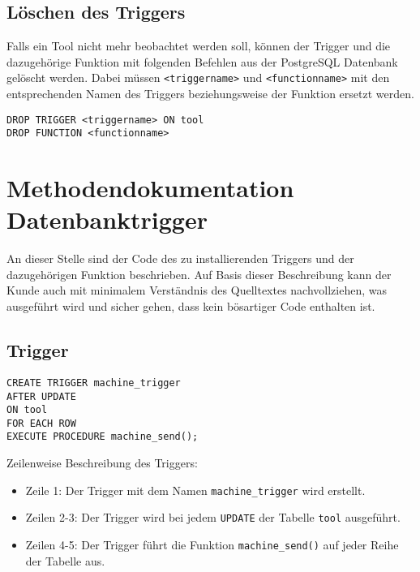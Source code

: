 \documentclass{scrartcl}
\begin{document}
\subsection{Löschen des Triggers}
Falls ein Tool nicht mehr beobachtet werden soll, können der Trigger und die dazugehörige Funktion mit folgenden Befehlen aus der PostgreSQL Datenbank gelöscht werden. Dabei müssen \lstinline`<triggername>` und \lstinline`<functionname>` mit den entsprechenden Namen des Triggers beziehungsweise der Funktion ersetzt werden.

\begin{lstlisting}[numbers=none, frame=none]
DROP TRIGGER <triggername> ON tool
DROP FUNCTION <functionname>
\end{lstlisting}


\section{Methodendokumentation Datenbanktrigger}
An dieser Stelle sind der Code des zu installierenden Triggers und der dazugehörigen Funktion beschrieben. Auf Basis dieser Beschreibung kann der Kunde auch mit minimalem Verständnis des Quelltextes nachvollziehen, was ausgeführt wird und sicher gehen, dass kein bösartiger Code enthalten ist.

\subsection{Trigger}
\begin{lstlisting}[label=trigger2,caption=Trigger]
CREATE TRIGGER machine_trigger
AFTER UPDATE
ON tool
FOR EACH ROW
EXECUTE PROCEDURE machine_send();
\end{lstlisting}
Zeilenweise Beschreibung des Triggers:
\begin{itemize}
\item Zeile 1: Der Trigger mit dem Namen \lstinline`machine_trigger` wird erstellt.
\item Zeilen 2-3: Der Trigger wird bei jedem \lstinline`UPDATE` der Tabelle \lstinline`tool` ausgeführt.
\item Zeilen 4-5: Der Trigger führt die Funktion \lstinline`machine_send()` auf jeder Reihe der Tabelle aus.
\end{itemize}
\end{document}
